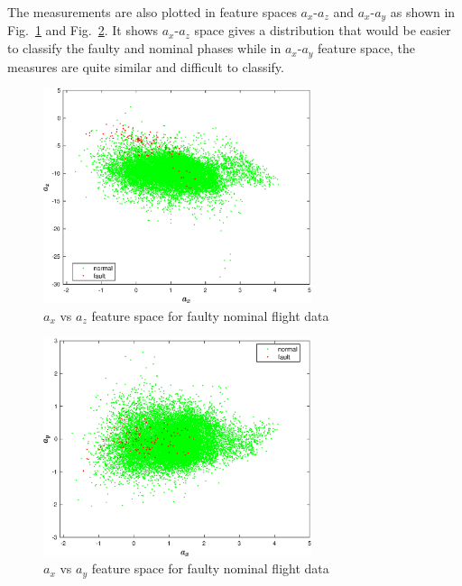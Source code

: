 

The measurements are also plotted in feature spaces $a_x$-$a_z$ and $a_x$-$a_y$ as shown in Fig.~\ref{fig:feat1vsfeat3FaultStuck} and Fig.~\ref{fig:feat1vsfeat2FaultStuck}. 
It shows $a_x$-$a_z$ space gives a distribution that would be easier to classify the faulty and nominal phases while in $a_x$-$a_y$ feature space, the measures are quite similar and difficult to classify.

\begin{figure}[!h]
\begin{center}
\includegraphics[width=0.7\textwidth]{figures/feat1vsfeat3FaultStuck}    %
\caption{$a_x$ vs $a_z$ feature space for faulty nominal flight data} 
\label{fig:feat1vsfeat3FaultStuck}
\end{center}
\end{figure}

\begin{figure}[!h]
\begin{center}
\includegraphics[width=0.7\textwidth]{figures/feat1vsfeat2FaultStuck}    %
\caption{$a_x$ vs $a_y$ feature space for faulty nominal flight data} 
\label{fig:feat1vsfeat2FaultStuck}
\end{center}
\end{figure}



